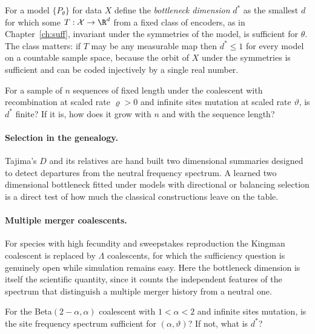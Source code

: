For a model $\{P_\theta\}$ for data $X$ define the \emph{bottleneck dimension} $d^*$ as the
smallest $d$ for which some $T:\mathcal X\to\R^d$ from a fixed class of encoders, as in Chapter~\ref{ch:suff}, invariant under the symmetries of the model, is sufficient for $\theta$. The class matters: if $T$ may be any measurable map then $d^*\le1$ for every model on a countable sample space, because the orbit of $X$ under the symmetries is sufficient and can be coded injectively by a single real number.

\begin{question}\label{future:q:arg}
For a sample of $n$ sequences of fixed length under the coalescent with recombination at scaled
rate $\varrho>0$ and infinite sites mutation at scaled rate $\vartheta$, is $d^*$ finite? If it is,
how does it grow with $n$ and with the sequence length?
\end{question}

\paragraph{Selection in the genealogy.} Tajima's $D$ and its relatives are hand built two
dimensional summaries designed to detect departures from the neutral frequency spectrum. A learned
two dimensional bottleneck fitted under models with directional or balancing selection is a direct
test of how much the classical constructions leave on the table.

\paragraph{Multiple merger coalescents.} For species with high fecundity and sweepstakes
reproduction the Kingman coalescent is replaced by $\Lambda$ coalescents, for which the sufficiency
question is genuinely open while simulation remains easy. Here the bottleneck dimension is itself
the scientific quantity, since it counts the independent features of the spectrum that distinguish
a multiple merger history from a neutral one.

\begin{question}\label{future:q:beta}
For the Beta$(2-\alpha,\alpha)$ coalescent with $1<\alpha<2$ and infinite sites mutation, is the
site frequency spectrum sufficient for $(\alpha,\vartheta)$? If not, what is $d^*$?
\end{question}

